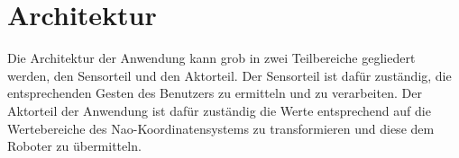 \section{Architektur}
Die Architektur der Anwendung kann grob in zwei Teilbereiche gegliedert werden, den Sensorteil und den Aktorteil.
Der Sensorteil ist dafür zuständig, die entsprechenden Gesten des Benutzers zu ermitteln und zu verarbeiten. Der Aktorteil der Anwendung ist dafür zuständig die Werte entsprechend auf die Wertebereiche des Nao-Koordinatensystems zu transformieren und diese dem Roboter zu übermitteln.




